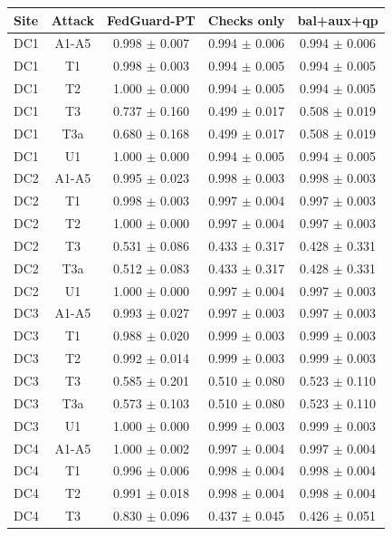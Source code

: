 \begin{tabular}{lcccc}
\hline
Site & Attack & FedGuard-PT & Checks only & bal+aux+qp \\
\hline
DC1 & A1-A5 & 0.998 $\pm$ 0.007 & 0.994 $\pm$ 0.006 & 0.994 $\pm$ 0.006 \\
DC1 & T1 & 0.998 $\pm$ 0.003 & 0.994 $\pm$ 0.005 & 0.994 $\pm$ 0.005 \\
DC1 & T2 & 1.000 $\pm$ 0.000 & 0.994 $\pm$ 0.005 & 0.994 $\pm$ 0.005 \\
DC1 & T3 & 0.737 $\pm$ 0.160 & 0.499 $\pm$ 0.017 & 0.508 $\pm$ 0.019 \\
DC1 & T3a & 0.680 $\pm$ 0.168 & 0.499 $\pm$ 0.017 & 0.508 $\pm$ 0.019 \\
DC1 & U1 & 1.000 $\pm$ 0.000 & 0.994 $\pm$ 0.005 & 0.994 $\pm$ 0.005 \\
DC2 & A1-A5 & 0.995 $\pm$ 0.023 & 0.998 $\pm$ 0.003 & 0.998 $\pm$ 0.003 \\
DC2 & T1 & 0.998 $\pm$ 0.003 & 0.997 $\pm$ 0.004 & 0.997 $\pm$ 0.003 \\
DC2 & T2 & 1.000 $\pm$ 0.000 & 0.997 $\pm$ 0.004 & 0.997 $\pm$ 0.003 \\
DC2 & T3 & 0.531 $\pm$ 0.086 & 0.433 $\pm$ 0.317 & 0.428 $\pm$ 0.331 \\
DC2 & T3a & 0.512 $\pm$ 0.083 & 0.433 $\pm$ 0.317 & 0.428 $\pm$ 0.331 \\
DC2 & U1 & 1.000 $\pm$ 0.000 & 0.997 $\pm$ 0.004 & 0.997 $\pm$ 0.003 \\
DC3 & A1-A5 & 0.993 $\pm$ 0.027 & 0.997 $\pm$ 0.003 & 0.997 $\pm$ 0.003 \\
DC3 & T1 & 0.988 $\pm$ 0.020 & 0.999 $\pm$ 0.003 & 0.999 $\pm$ 0.003 \\
DC3 & T2 & 0.992 $\pm$ 0.014 & 0.999 $\pm$ 0.003 & 0.999 $\pm$ 0.003 \\
DC3 & T3 & 0.585 $\pm$ 0.201 & 0.510 $\pm$ 0.080 & 0.523 $\pm$ 0.110 \\
DC3 & T3a & 0.573 $\pm$ 0.103 & 0.510 $\pm$ 0.080 & 0.523 $\pm$ 0.110 \\
DC3 & U1 & 1.000 $\pm$ 0.000 & 0.999 $\pm$ 0.003 & 0.999 $\pm$ 0.003 \\
DC4 & A1-A5 & 1.000 $\pm$ 0.002 & 0.997 $\pm$ 0.004 & 0.997 $\pm$ 0.004 \\
DC4 & T1 & 0.996 $\pm$ 0.006 & 0.998 $\pm$ 0.004 & 0.998 $\pm$ 0.004 \\
DC4 & T2 & 0.991 $\pm$ 0.018 & 0.998 $\pm$ 0.004 & 0.998 $\pm$ 0.004 \\
DC4 & T3 & 0.830 $\pm$ 0.096 & 0.437 $\pm$ 0.045 & 0.426 $\pm$ 0.051 \\

\end{tabular}
